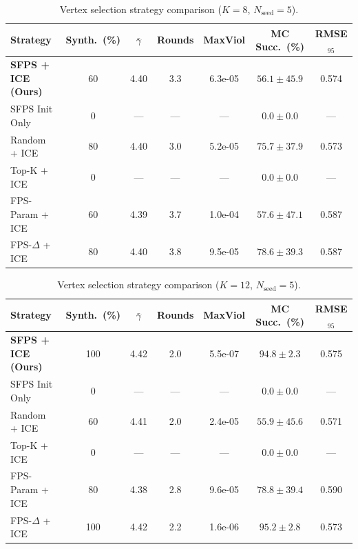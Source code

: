 \begin{table}[htbp]
\centering
\caption{Vertex selection strategy comparison ($K=8$, $N_\mathrm{seed}=5$).}
\label{tab:vsel_K8}
\begin{tabular}{l c c c c c c}
\toprule
\textbf{Strategy} & \textbf{Synth.\ (\%)} & \textbf{$\bar\gamma$} & \textbf{Rounds} & \textbf{MaxViol} & \textbf{MC Succ.\ (\%)} & \textbf{RMSE$_{95}$} \\
\midrule
\textbf{SFPS + ICE (Ours)} & 60 & 4.40 & 3.3 & 6.3e-05 & $56.1 \pm 45.9$ & 0.574 \\
SFPS Init Only & 0 & --- & --- & --- & $0.0 \pm 0.0$ & --- \\
Random + ICE & 80 & 4.40 & 3.0 & 5.2e-05 & $75.7 \pm 37.9$ & 0.573 \\
Top-K + ICE & 0 & --- & --- & --- & $0.0 \pm 0.0$ & --- \\
FPS-Param + ICE & 60 & 4.39 & 3.7 & 1.0e-04 & $57.6 \pm 47.1$ & 0.587 \\
FPS-$\Delta$ + ICE & 80 & 4.40 & 3.8 & 9.5e-05 & $78.6 \pm 39.3$ & 0.587 \\
\bottomrule
\end{tabular}
\end{table}

\begin{table}[htbp]
\centering
\caption{Vertex selection strategy comparison ($K=12$, $N_\mathrm{seed}=5$).}
\label{tab:vsel_K12}
\begin{tabular}{l c c c c c c}
\toprule
\textbf{Strategy} & \textbf{Synth.\ (\%)} & \textbf{$\bar\gamma$} & \textbf{Rounds} & \textbf{MaxViol} & \textbf{MC Succ.\ (\%)} & \textbf{RMSE$_{95}$} \\
\midrule
\textbf{SFPS + ICE (Ours)} & 100 & 4.42 & 2.0 & 5.5e-07 & $94.8 \pm 2.3$ & 0.575 \\
SFPS Init Only & 0 & --- & --- & --- & $0.0 \pm 0.0$ & --- \\
Random + ICE & 60 & 4.41 & 2.0 & 2.4e-05 & $55.9 \pm 45.6$ & 0.571 \\
Top-K + ICE & 0 & --- & --- & --- & $0.0 \pm 0.0$ & --- \\
FPS-Param + ICE & 80 & 4.38 & 2.8 & 9.6e-05 & $78.8 \pm 39.4$ & 0.590 \\
FPS-$\Delta$ + ICE & 100 & 4.42 & 2.2 & 1.6e-06 & $95.2 \pm 2.8$ & 0.573 \\
\bottomrule
\end{tabular}
\end{table}

